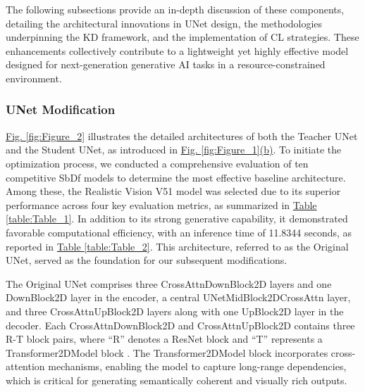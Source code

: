 \documentclass[a4paper,fleqn]{ieeetj}
\begin{document}
The following subsections provide an in-depth discussion of these components, detailing the architectural innovations in UNet design, the methodologies underpinning the KD framework, and the implementation of CL strategies. These enhancements collectively contribute to a lightweight yet highly effective model designed for next-generation generative AI tasks in a resource-constrained environment.
\subsubsection{UNet Modification}

\hyperref[fig:Figure_2]{Fig. \ref*{fig:Figure_2}} illustrates the detailed architectures of both the Teacher UNet and the Student UNet, as introduced in \hyperref[fig:Figure_1]{Fig. \ref*{fig:Figure_1}(b)}. To initiate the optimization process, we conducted a comprehensive evaluation of ten competitive SbDf models to determine the most effective baseline architecture. Among these, the Realistic Vision V51 model was selected due to its superior performance across four key evaluation metrics, as summarized in  \hyperref[table:Table_1]{Table \ref*{table:Table_1}}. In addition to its strong generative capability, it demonstrated favorable computational efficiency, with an inference time of 11.8344 seconds, as reported in  \hyperref[table:Table_2]{Table \ref*{table:Table_2}}. This architecture, referred to as the Original UNet, served as the foundation for our subsequent modifications.

The Original UNet comprises three CrossAttnDownBlock2D layers and one DownBlock2D layer in the encoder, a central UNetMidBlock2DCrossAttn layer, and three CrossAttnUpBlock2D layers along with one UpBlock2D layer in the decoder. Each CrossAttnDownBlock2D and CrossAttnUpBlock2D contains three R-T block pairs, where “R” denotes a ResNet block \cite{he2016deep} and “T” represents a Transformer2DModel block \cite{jaegle2021perceiver}. The Transformer2DModel block incorporates cross-attention mechanisms, enabling the model to capture long-range dependencies, which is critical for generating semantically coherent and visually rich outputs.
\end{document}
